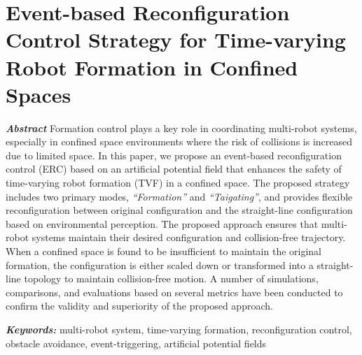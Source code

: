 \chapter{Event-based Reconfiguration Control Strategy for Time-varying Robot Formation in Confined Spaces}\label{paper2}

\vspace{1cm}

\noindent\textit{\textbf{Abstract}}
Formation control plays a key role in coordinating multi-robot systems, especially in confined space environments where the risk of collisions is increased due to limited space. In this paper, we propose an event-based reconfiguration control (ERC) based on an artificial potential field that enhances the safety of time-varying robot formation (TVF) in a confined space. The proposed strategy includes two primary modes, \textit{``Formation''} and \textit{``Taigating''}, and provides flexible reconfiguration between original configuration and the straight-line configuration based on environmental perception. The proposed approach ensures that multi-robot systems maintain their desired configuration and collision-free trajectory. When a confined space is found to be insufficient to maintain the original formation, the configuration is either scaled down or transformed into a straight-line topology to maintain collision-free motion. A number of simulations, comparisons, and evaluations based on several metrics have been conducted to confirm the validity and superiority of the proposed approach.

\noindent\textbf{\textit{Keywords:}}
multi-robot system, time-varying formation, reconfiguration control, obstacle avoidance, event-triggering, artificial potential fields







